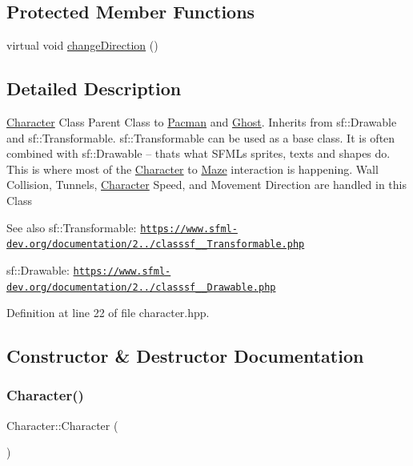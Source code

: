 \subsection*{Protected Member Functions}
\begin{DoxyCompactItemize}
\item 
virtual void \hyperlink{class_character_ab4c0dc6f72c78607b921cf312e10ed35}{change\+Direction} ()
\end{DoxyCompactItemize}


\subsection{Detailed Description}
\hyperlink{class_character}{Character} Class Parent Class to \hyperlink{class_pacman}{Pacman} and \hyperlink{class_ghost}{Ghost}. Inherits from sf\+::\+Drawable and sf\+::\+Transformable. sf\+::\+Transformable can be used as a base class. It is often combined with sf\+::\+Drawable – that\textquotesingle{}s what S\+F\+ML\textquotesingle{}s sprites, texts and shapes do. This is where most of the \hyperlink{class_character}{Character} to \hyperlink{class_maze}{Maze} interaction is happening. Wall Collision, Tunnels, \hyperlink{class_character}{Character} Speed, and Movement Direction are handled in this Class \begin{DoxySeeAlso}{See also}
sf\+::\+Transformable\+: \href{https://www.sfml-dev.org/documentation/2.4.2/classsf_1_1Transformable.php}{\tt https\+://www.\+sfml-\/dev.\+org/documentation/2../classsf\+\_\+\_\+Transformable.\+php} 

sf\+::\+Drawable\+: \href{https://www.sfml-dev.org/documentation/2.4.2/classsf_1_1Drawable.php}{\tt https\+://www.\+sfml-\/dev.\+org/documentation/2../classsf\+\_\+\_\+Drawable.\+php} 
\end{DoxySeeAlso}


Definition at line 22 of file character.\+hpp.



\subsection{Constructor \& Destructor Documentation}
\mbox{\label{class_character_adc27bdd255876169bad2ed0bae0cffb5}} 
\subsubsection{\texorpdfstring{Character()}{Character()}}
{\footnotesize\ttfamily Character\+::\+Character (\begin{DoxyParamCaption}{ }\end{DoxyParamCaption})}

